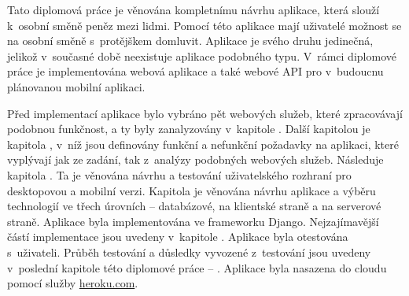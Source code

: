 \begin{introduction}
Tato diplomová práce je věnována kompletnímu návrhu aplikace, která slouží k~osobní směně peněz mezi lidmi. Pomocí této aplikace mají uživatelé možnost se na osobní směně s~protějškem domluvit. Aplikace je svého druhu jedinečná, jelikož v~současné době neexistuje aplikace podobného typu. V~rámci diplomové práce je implementována webová aplikace a také webové API pro v~budoucnu plánovanou mobilní aplikaci.

Před implementací aplikace bylo vybráno pět webových služeb, které zpracovávají podobnou funkčnost, a ty byly zanalyzovány v~kapitole \textit{}. Další kapitolou je kapitola \textit{}, v~níž jsou definovány funkční a nefunkční požadavky na aplikaci, které vyplývají jak ze zadání, tak z~analýzy podobných webových služeb. Následuje kapitola \textit{}. Ta je věnována návrhu a testování uživatelského rozhraní pro desktopovou a mobilní verzi. Kapitola \textit{} je věnována návrhu aplikace a výběru technologií ve třech úrovních -- databázové, na klientské straně a na serverové straně. Aplikace byla implementována ve frameworku Django. Nejzajímavější částí implementace jsou uvedeny v~kapitole \textit{}. Aplikace byla otestována s~uživateli. Průběh testování a důsledky vyvozené z~testování jsou uvedeny v~poslední kapitole této diplomové práce -- \textit{}. Aplikace byla nasazena do cloudu pomocí služby \url{heroku.com}\cite{heroku}.
\end{introduction}